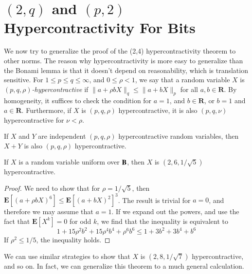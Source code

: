 \section{$(2,q)$ and $(p,2)$ Hypercontractivity For Bits}

We now try to generalize the proof of the (2,4) hypercontractivity theorem to other norms. The reason why hypercontractivity is more easy to generalize than the Bonami lemma is that it doesn't depend on reasonability, which is translation sensitive. For $1 \leq p \leq q \leq \infty$, and $0 \leq \rho < 1$, we say that a random variable $X$ is \emph{$(p,q,\rho)$-hypercontractive} if $\| a + \rho b X \|_q \leq \| a + b X \|_p$ for all $a,b \in \mathbf{R}$. By homogeneity, it suffices to check the condition for $a = 1$, and $b \in \mathbf{R}$, or $b = 1$ and $a \in \mathbf{R}$. Furthermore, if $X$ is $(p,q,\rho)$ hypercontractive, it is also $(p,q,\nu)$ hypercontractive for $\nu < \rho$.

\begin{theorem}
    If $X$ and $Y$ are independent $(p,q,\rho)$ hypercontractive random variables, then $X + Y$ is also $(p,q,\rho)$ hypercontractive.
\end{theorem}

\begin{theorem}
    If $X$ is a random variable uniform over $\operatorname{\mathbf{B}}$, then $X$ is $(2,6,1/\sqrt{5})$ hypercontractive.
\end{theorem}
\begin{proof}
    We need to show that for $\rho = 1/\sqrt{5}$, then $\mathbf{E}[(a + \rho b X)^6] \leq \mathbf{E}[(a + bX)^2]^3$. The result is trivial for $a = 0$, and therefore we may assume that $a = 1$. If we expand out the powers, and use the fact that $\mathbf{E}[X^k] = 0$ for odd $k$, we find that the inequality is equivalent to
    \[ 1 + 15 \rho^2 b^2 + 15 \rho^4 b^4 + \rho^6 b^6 \leq 1 + 3b^2 + 3b^4 + b^6 \]
    If $\rho^2 \leq 1/5$, the inequality holds.
\end{proof}

We can use similar strategies to show that $X$ is $(2,8,1/\sqrt{7})$ hypercontractive, and so on. In fact, we can generalize this theorem to a much general calculation.

